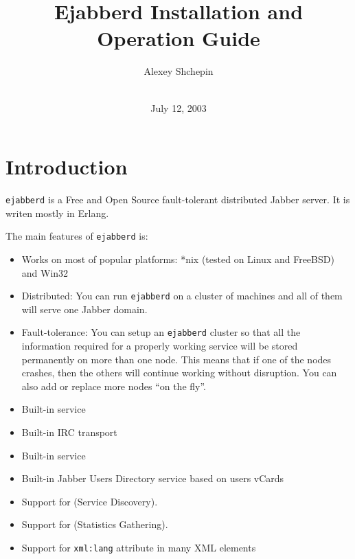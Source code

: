\documentclass[10pt]{article}
\title{Ejabberd Installation and Operation Guide}
\author{Alexey Shchepin \\
  \ahrefurl{mailto:alexey@sevcom.net} \\
  \ahrefurl{xmpp:aleksey@jabber.ru}}
\date{July 12, 2003}
\newcommand{\logoscale}{0.7}
\newcommand{\insscaleimg}[2]{
  \imgsrc{#2}{}
  \begin{latexonly}
    \scalebox{#1}{\texttt{[image: \#2]}}
  \end{latexonly}
}
\newcommand{\ns}[1]{\texttt{#1}}
\newcommand{\ejabberd}{\texttt{ejabberd}}
\newcommand{\Jabber}{Jabber}
\begin{document}
\begin{titlepage}
  \maketitle{}
  
  {\centering
    \insscaleimg{\logoscale}{logo.png}
    \par
  }
\end{titlepage}
\tableofcontents{}

\newpage
\section{Introduction}
\label{sec:intro}

\ejabberd{} is a Free and Open Source fault-tolerant distributed \Jabber{}
server.  It is writen mostly in Erlang.

The main features of \ejabberd{} is:
\begin{itemize}
\item Works on most of popular platforms: *nix (tested on Linux and FreeBSD)
  and Win32
\item Distributed: You can run \ejabberd{} on a cluster of machines and all of
  them will serve one Jabber domain.
\item Fault-tolerance: You can setup an \ejabberd{} cluster so that all the
  information required for a properly working service will be stored
  permanently on more than one node.  This means that if one of the nodes
  crashes, then the others will continue working without disruption.
  You can also add or replace more nodes ``on the fly''.
\item Built-in  service
\item Built-in IRC transport
\item Built-in
  service
\item Built-in Jabber Users Directory service based on users vCards
\item Support for
  (Service Discovery).
\item Support for
  (Statistics Gathering).
\item Support for \ns{xml:lang} attribute in many XML elements
\end{itemize}
\end{document}
